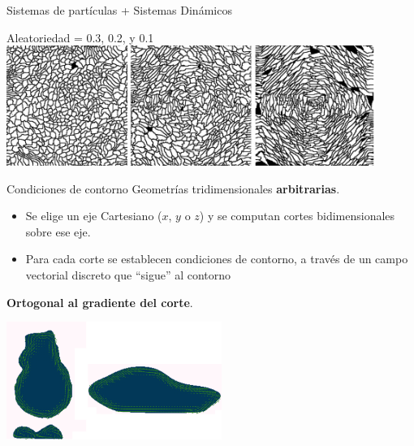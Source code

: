 \documentclass[spanish,unknownkeysallowed]{beamer}
\begin{document}

\begin{frame}{Sistemas de partículas + Sistemas Dinámicos}

Aleatoriedad = 0.3, 0.2, y 0.1
\vspace{0.1cm}
  \includegraphics[width=12cm]{../figures/Fig3}
\end{frame}

\begin{frame}{Condiciones de contorno}
Geometrías tridimensionales \textbf{arbitrarias}.

\begin{itemize}
\item Se elige un eje Cartesiano ($x$, $y$ o $z$) y se computan cortes bidimensionales sobre ese eje.
\item Para cada corte se establecen condiciones de contorno, a través de un campo vectorial discreto que ``sigue'' al contorno
\end{itemize}

\textbf{Ortogonal al gradiente del corte}.

  \centerline{\includegraphics[width=7cm]{../figures/Fig4}}
\end{frame}
\end{document}
